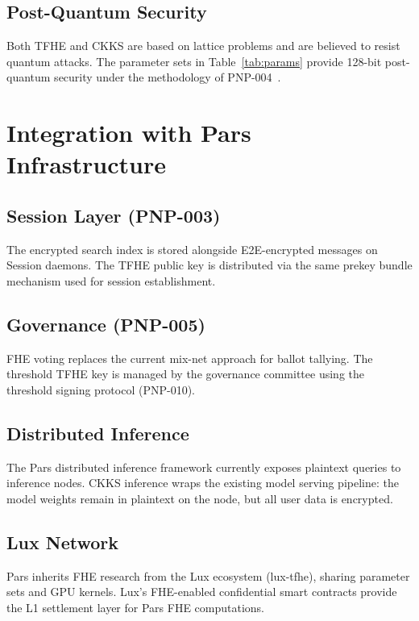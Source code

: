 \documentclass[11pt,a4paper]{article}
\begin{document}
\subsection{Post-Quantum Security}

Both TFHE and CKKS are based on lattice problems and are believed to
resist quantum attacks.  The parameter sets in Table~\ref{tab:params}
provide 128-bit post-quantum security under the methodology of
PNP-004~\cite{pnp004_pq}.

\section{Integration with Pars Infrastructure}
\label{sec:integration}

\subsection{Session Layer (PNP-003)}

The encrypted search index is stored alongside E2E-encrypted messages
on Session daemons.  The TFHE public key is distributed via the same
prekey bundle mechanism used for session establishment.

\subsection{Governance (PNP-005)}

FHE voting replaces the current mix-net approach for ballot tallying.
The threshold TFHE key is managed by the governance committee using
the threshold signing protocol (PNP-010).

\subsection{Distributed Inference}

The Pars distributed inference framework currently exposes plaintext
queries to inference nodes.  CKKS inference wraps the existing model
serving pipeline: the model weights remain in plaintext on the node,
but all user data is encrypted.

\subsection{Lux Network}

Pars inherits FHE research from the Lux ecosystem (lux-tfhe), sharing
parameter sets and GPU kernels.  Lux's FHE-enabled confidential smart
contracts provide the L1 settlement layer for Pars FHE computations.
\end{document}
